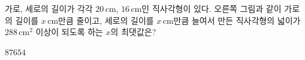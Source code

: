 \hspace*{2mm}\begin{minipage}[t]{\dimexpr\linewidth-2mm\relax}\vspace{0pt}
\noindent\begin{minipage}[t]{0.58\linewidth}\vspace{0pt}\raggedright 가로, 세로의 길이가 각각 $20\,\mathrm{cm}$, $16\,\mathrm{cm}$인 직사각형이 있다. 오른쪽 그림과 같이 가로의 길이를 $x\,\mathrm{cm}$만큼 줄이고, 세로의 길이를 $x\,\mathrm{cm}$만큼 늘여서 만든 직사각형의 넓이가 $288\,\mathrm{cm}^2$ 이상이 되도록 하는 $x$의 최댓값은?\end{minipage}\hfill\begin{minipage}[t]{0.4\linewidth}\vspace{0pt}\centering \resizebox{\ifdim\width>\linewidth\linewidth\else\width\fi}{!}{}\end{minipage}\par
\begin{choices32}{$8$}{$7$}{$6$}{$5$}{$4$}\end{choices32}\end{minipage}
